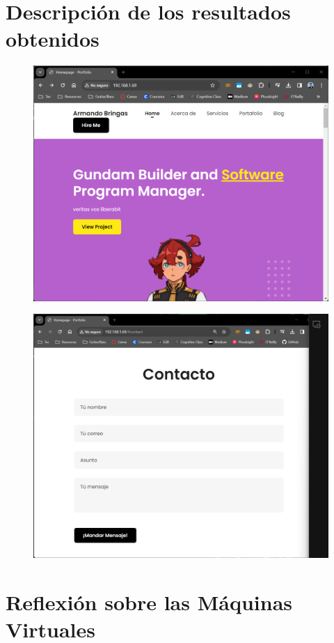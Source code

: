 \documentclass[12pt,a4paper]{article}
\begin{document}
\section{Descripción de los resultados obtenidos}

\begin{figure}[H]
    \centering
    \includegraphics[width=1\linewidth]{M3_Virtualización_y_Contenedores/Tarea_2_Máquina_Virtual_Local/reporte/figuras/7-1_Resultados.png}
    \label{fig:Resultados_1}
\end{figure}


\begin{figure}[H]
    \centering
    \includegraphics[width=1\linewidth]{M3_Virtualización_y_Contenedores/Tarea_2_Máquina_Virtual_Local/reporte/figuras/7-2_Resultados.png}
    \label{fig:Resultados_2}
\end{figure}


\section{Reflexión sobre las Máquinas Virtuales}

\vspace{1em}
\end{document}
